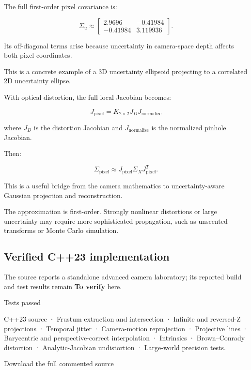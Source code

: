 The full first-order pixel covariance is:

\[
 \boxed{ \Sigma_u\approx \begin{bmatrix} 2.9696&-0.41984\\ -0.41984&3.119936 \end{bmatrix} }.
\]

Its off-diagonal terms arise because uncertainty in camera-space depth affects both pixel coordinates.

This is a concrete example of a 3D uncertainty ellipsoid projecting to a correlated 2D uncertainty ellipse.

With optical distortion, the full local Jacobian becomes:

\[
 \boxed{ J_{\mathrm{pixel}} = K_{2\times2}J_DJ_{\mathrm{normalize}} }
\]

where \(J_D\) is the distortion Jacobian and \(J_{\mathrm{normalize}}\) is the normalized pinhole Jacobian.

Then:

\[
 \boxed{ \Sigma_{\mathrm{pixel}} \approx J_{\mathrm{pixel}} \Sigma_X J_{\mathrm{pixel}}^T }.
\]

This is a useful bridge from the camera mathematics to uncertainty-aware Gaussian projection and reconstruction.

The approximation is first-order. Strongly nonlinear distortions or large uncertainty may require more sophisticated propagation, such as unscented transforms or Monte Carlo simulation.

\subsection{Verified C++23 implementation}\label{02-foundations-ii-ch037-verified-c23-implementation}

\hypertarget{02-foundations-ii-ch037-verified-c23-implementation}{}

The source reports a standalone advanced camera laboratory; its reported build and test results remain \textbf{To verify} here.

Tests passed

C++23 source · Frustum extraction and intersection · Infinite and reversed-Z projections · Temporal jitter · Camera-motion reprojection · Projective lines · Barycentric and perspective-correct interpolation · Intrinsics · Brown--Conrady distortion · Analytic-Jacobian undistortion · Large-world precision tests.

Download the full commented source

